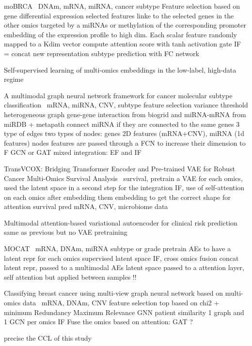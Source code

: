 \documentclass[../main.tex]{subfiles}
\begin{document}
		moBRCA~\cite{moBRCA}
		DNAm, mRNA, miRNA, cancer subtype
		Feature selection based on gene differential expression
		selected features linke to the selected genes in the other omics
		targeted by a miRNAs or methylation of the corresponding promoter
		embedding of the expression profile to high dim. Each scalar feature randomly mapped to a Kdim vector
		compute attention score with tanh activation gate
		IF = concat new representation
		subtype prediction with FC network

		Self-supervised learning of multi-omics embeddings in the low-label, high-data regime

		A multimodal graph neural network framework for cancer molecular subtype classification~\cite{Li2024}
		mRNA, miRNA, CNV, subtype
		feature selection variance threshold
		heterogeneous graph gene-gene interaction from biogrid and miRNA-mRNA from miRDB + metapath connect miRNA if they are connected to the same genes
		3 type of edges
		two types of nodes: genes 2D features (mRNA+CNV), miRNA (1d features)
		nodes features are passed through a FCN to increase their dimension to F
		GCN or GAT
		mixed integration: EF and IF

		TransVCOX: Bridging Transformer Encoder and Pre-trained VAE for Robust Cancer Multi-Omics Survival Analysis~\cite{10385668}
		survival, pretrain a VAE for each omics, used the latent space in a second step for the integration
		IF, use of self-attention on each omics after embedding them embedding to get the correct shape for attention
		survival pred
		mRNA, CNV, microbiome data

		Multimodal attention-based variational autoencoder for clinical risk prediction~\cite{Li2023}
		same as previous but no VAE pretraining

		MOCAT~\cite{Yao_2024}
		mRNA, DNAm, miRNA
		subtype or grade
		pretrain AEs to have a latent repr for each omics
		supervised latent space
		IF, cross omics fusion
		concat latent repr, passed to a multimodal AEs
		latent space passed to a attention layer, self attention but applied between samples !!


		Classifying breast cancer using multi-view graph neural network based on multi-omics data~\cite{Ren2024}
		mRNA, DNAm, CNV
		feature selection top based on chi2 + minimum Redundancy Maximum Relevance
		GNN patient similarity
		1 graph and 1 GCN per omics IF
		Fuse the omics based on attention: GAT ?

		precise the CCL of this study
\end{document}

